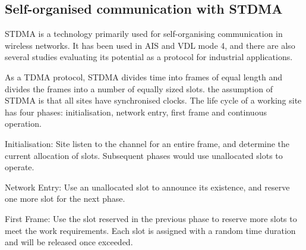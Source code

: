 \documentclass[12pt, oneside]{article}
\begin{document}
\subsection{Self-organised communication with STDMA}



STDMA\cite{STDMA} is a technology primarily used for self-organising communication in wireless networks. It has been used in AIS and VDL mode 4\cite{STDMA}, and there are also several studies evaluating its potential as a protocol for industrial applications\cite{STDMA_for_industry}.

As a TDMA protocol, STDMA divides time into frames of equal length and divides the frames into a number of equally sized slots. the assumption of STDMA is that all sites have synchronised clocks. The life cycle of a working site has four phases: initialisation, network entry, first frame and continuous operation.

Initialisation: Site listen to the channel for an entire frame, and determine the current allocation of slots. Subsequent phases would use unallocated slots to operate.

Network Entry: Use an unallocated slot to announce its existence, and reserve one more slot for the next phase.

First Frame: Use the slot reserved in the previous phase to reserve more slots to meet the work requirements. Each slot is assigned with a random time duration and will be released once exceeded. 
\end{document}
